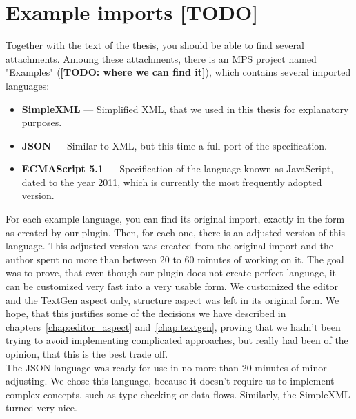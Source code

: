 \chapter{Example imports [TODO]}

Together with the text of the thesis, you should be able to find several attachments.
Amoung these attachments, there is an MPS project named "Examples" (\textbf{[TODO: where we can find it]}), which contains several imported languages:

\begin{itemize}
	\item \textbf{SimpleXML} --- Simplified XML, that we used in this thesis for explanatory purposes.
	
	\item \textbf{JSON} --- Similar to XML, but this time a full port of the specification.
	
	\item \textbf{ECMAScript 5.1} --- Specification of the language known as JavaScript, dated to the year 2011, which is currently the most frequently adopted version.
\end{itemize}

For each example language, you can find its original import, exactly in the form as created by our plugin.
Then, for each one, there is an adjusted version of this language.
This adjusted version was created from the original import and the author spent no more than between 20 to 60 minutes of working on it.
The goal was to prove, that even though our plugin does not create perfect language, it can be customized very fast into a very usable form.
We customized the editor and the TextGen aspect only, structure aspect was left in its original form.
We hope, that this justifies some of the decisions we have described in chapters~\ref{chap:editor_aspect} and~\ref{chap:textgen}, proving that we hadn't been trying to avoid implementing complicated approaches, but really had been of the opinion, that this is the best trade off.
\\

The JSON language was ready for use in no more than 20 minutes of minor adjusting.
We chose this language, because it doesn't require us to implement complex concepts, such as type checking or data flows.
Similarly, the SimpleXML turned very nice.
\\

